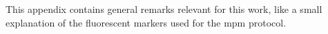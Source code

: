 
This appendix contains general remarks relevant for this work, like a small explanation of the fluorescent markers used for the \gls{mpm} protocol.
